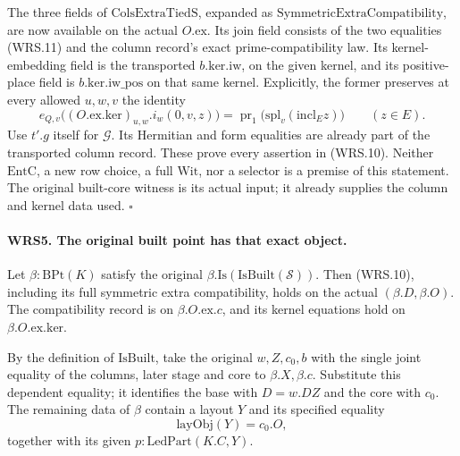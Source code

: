 The three fields of \(\mathrm{ColsExtraTiedS}\), expanded as
\(\mathrm{SymmetricExtraCompatibility}\), are now available on
the actual \(O.\mathrm{ex}\).  Its join field consists of the two
equalities (WRS.11) and the column record's exact prime-compatibility
law.  Its kernel-embedding field is the transported
\(b.\mathrm{ker.iw}\), on the given kernel, and its positive-place
field is \(b.\mathrm{ker.iw\_pos}\) on that same kernel.  Explicitly,
the former preserves at every allowed \(u,w,v\) the identity
\[
 e_{Q,v}\bigl((O.\mathrm{ex.ker})_{u,w}.i_w(0,v,z)\bigr)
   =\operatorname{pr}_1\bigl(\mathrm{spl}_v(\mathrm{incl}_E z)\bigr)
       \qquad(z\in E).                              \tag{WRS.12}
\]
Use \(t'.g\) itself for \(\mathcal G\).  Its Hermitian and form
equalities are already part of the transported column record.
These prove every assertion in (WRS.10).  Neither \(\mathrm{EntC}\),
a new row choice, a full \(\mathrm{Wit}\), nor a selector is a
premise of this statement.  The original built-core witness is its
actual input; it already supplies the column and kernel data used.
\hfill\(\square\)

\paragraph{WRS5. The original built point has that exact object.}
\label{claim:WRS5}
Let \(\beta:\mathrm{BPt}(K)\) satisfy the original
\(\beta.\mathrm{Is}(\mathrm{IsBuilt}(\mathcal S))\).
Then (WRS.10), including its full symmetric extra compatibility,
holds on the actual \((\beta.D,\beta.O)\).
The compatibility record is on \(\beta.O.\mathrm{ex}.c\), and
its kernel equations hold on \(\beta.O.\mathrm{ex.ker}\).

By the definition of \(\mathrm{IsBuilt}\), take the original
\(w,Z,c_0,b\) with the single joint equality of the columns,
later stage and core to \(\beta.X,\beta.c\).  Substitute this
dependent equality; it identifies the base with \(D=w.DZ\)
and the core with \(c_0\).  The remaining data of \(\beta\)
contain a layout \(Y\) and its specified equality
\[
                 \mathrm{layObj}(Y)=c_0.O,
 \tag{WRS.13}
\]
together with its given \(p:\mathrm{LedPart}(K.C,Y)\).

